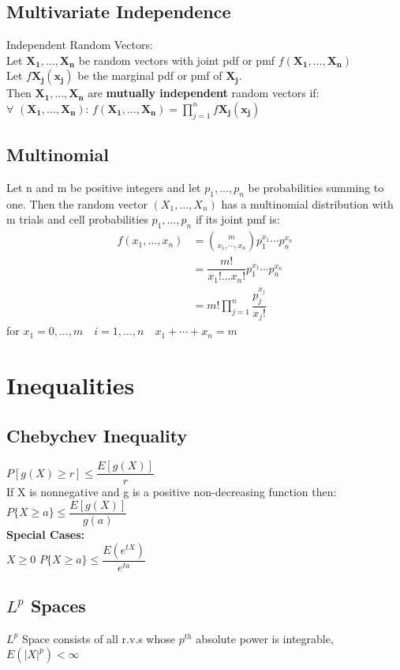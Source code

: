 \documentclass[openany]{book}
\begin{document}
\begin{flushleft}
\section{Multivariate Independence}
Independent Random Vectors:\\
Let $\boldsymbol{X_1},\dots,\boldsymbol{X_n}$ be random vectors with joint pdf or pmf $f(\boldsymbol{X_1},\dots,\boldsymbol{X_n})$\\
Let $f\boldsymbol{X_j}(\boldsymbol{x_j})$ be the marginal pdf or pmf of $\boldsymbol{X_j}$.\\
Then $\boldsymbol{X_1},\dots,\boldsymbol{X_n}$ are \textbf{mutually independent} random vectors if:\\
$\forall$ $(\boldsymbol{X_1},\dots,\boldsymbol{X_n})$: \quad  $f(\boldsymbol{X_1},\dots,\boldsymbol{X_n})=\prod_{j=1}^{n}f\boldsymbol{X_j}(\boldsymbol{x_j})$
\section{Multinomial}
Let n and m be positive integers and let $p_1,\dots,p_n$ be probabilities summing to one. Then the random vector $(X_1,\dots,X_n)$ has a multinomial distribution with m trials and cell probabilities $p_1,\dots,p_n$ if its joint pmf is:
\begin{align*}
f(x_1,\dots,x_n)&={m \choose x_1,\cdots,x_n} p_1^{x_1}\cdots p_n^{x_n}\\
&=\dfrac{m!}{x_1! \dots x_n!}p_1^{x_1}\cdots p_n^{x_n}\\
&= m!\prod_{j=1}^{n}\dfrac{p_j^{x_j}}{x_j!}
\end{align*}
for $x_1=0,\dots,m \quad i=1,\dots,n \quad x_1+\cdots+x_n=m$
\chapter{Inequalities}
\section{Chebychev Inequality}
$P[g(X)\geq r] \leq \dfrac{E[g(X)]}{r}$\\
If X is nonnegative and g is a positive non-decreasing function then:\\
$P\{X\geq a \}\leq \dfrac{E[g(X)]}{g(a)}$\\
\textbf{Special Cases:}\\
$X\geq 0$ \quad $P\{X\geq a \}\leq \dfrac{E(e^{tX})}{e^{ta}}$\\
\section{$L^p$ Spaces}
$L^p$ Space consists of all r.v.s whose $p^{th}$ absolute power is integrable, $E(|X|^p)<\infty$\\

\end{flushleft}
\end{document}
